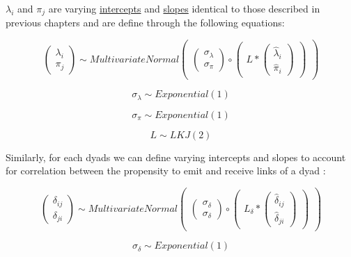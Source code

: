 \documentclass[
  letterpaper,
  DIV=11,
  numbers=noendperiod]{scrreprt}
\begin{document}
\(\lambda_i\) and \(\pi_j\) are varying
\href{12.\%20Varying\%20intercepts.qmd}{intercepts} and
\href{13.\%20Varying\%20slopes.qmd}{slopes} identical to those described
in previous chapters and are define through the following equations:

\[
\left(\begin{array}{cc} 
\lambda_i \\
\pi_j 
\end{array}\right) 
\sim 
MultivariateNormal\left(\begin{array}{cc} 
\left(\begin{array}{cc} 
\sigma_\lambda \\
\sigma_\pi
\end{array}\right) \circ 
\left(\begin{array}{cc} 
L *
\left(\begin{array}{cc} 
\hat{\lambda}_i \\ \hat{\pi}_i
\end{array}\right)
\end{array}\right)
\end{array}\right)
\]

\[
\sigma_\lambda \sim Exponential(1)
\]

\[
\sigma_\pi \sim Exponential(1)
\]

\[
L \sim LKJ(2)
\]

Similarly, for each dyads we can define varying intercepts and slopes to
account for correlation between the propensity to emit and receive links
of a dyad :

\[
\left(\begin{array}{cc} 
\delta_{ij} \\
\delta_{ji}
\end{array}\right) 
\sim 
MultivariateNormal\left(\begin{array}{cc} 
\left(\begin{array}{cc} 
\sigma_\delta \\
\sigma_\delta
\end{array}\right) \circ 
\left(\begin{array}{cc} 
L_\delta *
\left(\begin{array}{cc} 
\hat{\delta}_{ij} \\ \hat{\delta}_{ji}
\end{array}\right)
\end{array}\right)
\end{array}\right)
\]

\[
\sigma_\delta \sim Exponential(1)
\]
\end{document}
